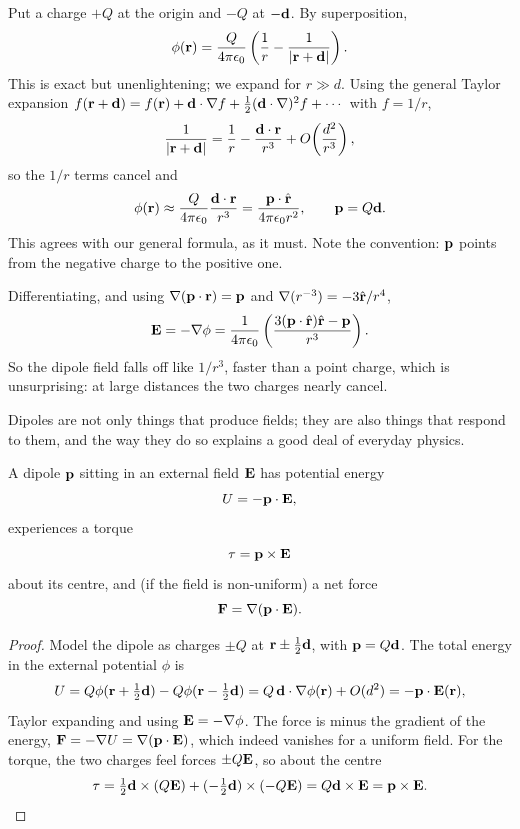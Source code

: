\documentclass[a4paper]{scrartcl}
\newcommand{\hh}[1]{\hat{\vv{#1}}}
\begin{document}
\begin{example}
	Put a charge $+Q$ at the origin and $-Q$ at $-\mathbf{d}$. By superposition,
	$$
	\phi(\mathbf{r}) = \frac{Q}{4\pi\epsilon_0}\left(\frac{1}{r} - \frac{1}{|\mathbf{r}+\mathbf{d}|}\right).
	$$
	This is exact but unenlightening; we expand for $r \gg d$. Using the general Taylor expansion $f(\mathbf{r}+\mathbf{d}) = f(\mathbf{r}) + \mathbf{d}\cdot \nabla f + \tfrac{1}{2}(\mathbf{d}\cdot \nabla)^2 f + \cdots$ with $f = 1/r$,
	$$
	\frac{1}{|\mathbf{r}+\mathbf{d}|} = \frac{1}{r} - \frac{\mathbf{d}\cdot \mathbf{r}}{r^3} + O\!\left(\frac{d^2}{r^3}\right),
	$$
	so the $1/r$ terms cancel and
	$$
	\phi(\vv{r}) \approx \frac{Q}{4\pi\epsilon_0}\frac{\vv{d}\cdot \vv{r}}{r^3} = \frac{\vv{p}\cdot \hh{r}}{4\pi\epsilon_0 r^2}, \qquad \vv{p} = Q\vv{d}.
	$$
	This agrees with our general formula, as it must. Note the convention: $\mathbf{p}$ points from the negative charge to the positive one.

	Differentiating, and using $\nabla(\mathbf{p}\cdot \mathbf{r}) = \mathbf{p}$ and $\nabla(r^{-3}) = -3\hh{r}/r^4$,
	$$
	\vv{E} = -\nabla \phi = \frac{1}{4\pi \epsilon_0}\left(\frac{3(\vv{p}\cdot \hh{r})\hh{r} - \vv{p}}{r^3}\right).
	$$
	So the dipole field falls off like $1/r^3$, faster than a point charge, which is unsurprising: at large distances the two charges nearly cancel.
\end{example}

Dipoles are not only things that produce fields; they are also things that respond to them, and the way they do so explains a good deal of everyday physics.

\begin{proposition}
	\label{prop:dipole-external}
	A dipole $\mathbf{p}$ sitting in an external field $\mathbf{E}$ has potential energy
	$$
	U = -\mathbf{p}\cdot\mathbf{E},
	$$
	experiences a torque
	$$
	\mathbf{\tau} = \mathbf{p}\times \mathbf{E}
	$$
	about its centre, and (if the field is non-uniform) a net force
	$$
	\mathbf{F} = \nabla(\mathbf{p}\cdot\mathbf{E}).
	$$
\end{proposition}
\begin{proof}
	Model the dipole as charges $\pm Q$ at $\mathbf{r}\pm\tfrac12\mathbf{d}$, with $\mathbf{p} = Q\mathbf{d}$. The total energy in the external potential $\phi$ is
	$$
	U = Q\phi(\mathbf{r}+\tfrac12\mathbf{d}) - Q\phi(\mathbf{r}-\tfrac12\mathbf{d}) = Q\,\mathbf{d}\cdot\nabla\phi(\mathbf{r}) + O(d^2) = -\mathbf{p}\cdot\mathbf{E}(\mathbf{r}),
	$$
	Taylor expanding and using $\mathbf{E} = -\nabla\phi$. The force is minus the gradient of the energy, $\mathbf{F} = -\nabla U = \nabla(\mathbf{p}\cdot\mathbf{E})$, which indeed vanishes for a uniform field. For the torque, the two charges feel forces $\pm Q\mathbf{E}$, so about the centre
	$$
	\mathbf{\tau} = \tfrac12\mathbf{d}\times(Q\mathbf{E}) + (-\tfrac12\mathbf{d})\times(-Q\mathbf{E}) = Q\mathbf{d}\times\mathbf{E} = \mathbf{p}\times\mathbf{E}. \qedhere
	$$
\end{proof}
\end{document}
